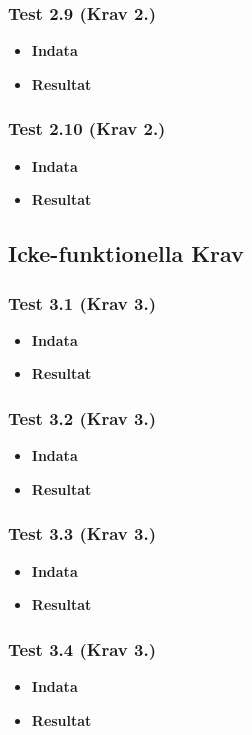 \documentclass{TDP003mall}
\begin{document}
\subsubsection*{Test 2.9 (Krav 2.)}
\begin{itemize}
\item[]\textbf{Indata} 
\item[]\textbf{Resultat} 
\end{itemize}
\subsubsection*{Test 2.10 (Krav 2.)}
\begin{itemize}
\item[]\textbf{Indata} 
\item[]\textbf{Resultat} 
\end{itemize}

\subsection{Icke-funktionella Krav}
\subsubsection*{Test 3.1 (Krav 3.)}
\begin{itemize}
\item[]\textbf{Indata} 
\item[]\textbf{Resultat} 
\end{itemize}
\subsubsection*{Test 3.2 (Krav 3.)}
\begin{itemize}
\item[]\textbf{Indata} 
\item[]\textbf{Resultat} 
\end{itemize}
\subsubsection*{Test 3.3 (Krav 3.)}
\begin{itemize}
\item[]\textbf{Indata} 
\item[]\textbf{Resultat} 
\end{itemize}
\subsubsection*{Test 3.4 (Krav 3.)}
\begin{itemize}
\item[]\textbf{Indata} 
\item[]\textbf{Resultat} 
\end{itemize}
\end{document}
